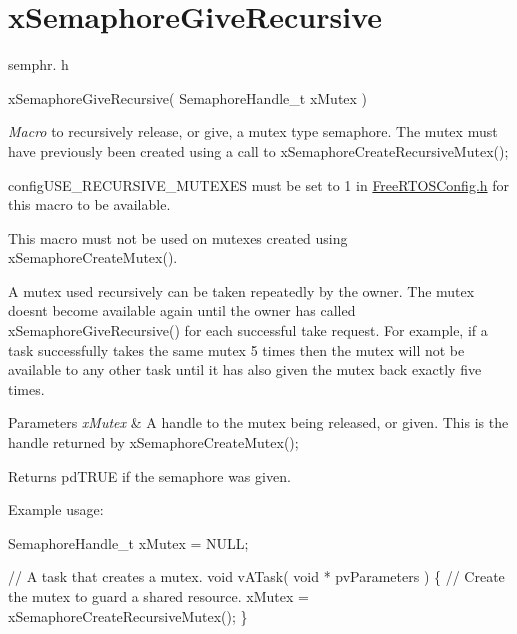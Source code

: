 \hypertarget{group__x_semaphore_give_recursive}{}\section{x\+Semaphore\+Give\+Recursive}
\label{group__x_semaphore_give_recursive}
semphr. h 
\begin{DoxyPre}xSemaphoreGiveRecursive( SemaphoreHandle\_t xMutex )\end{DoxyPre}


{\itshape Macro} to recursively release, or \textquotesingle{}give\textquotesingle{}, a mutex type semaphore. The mutex must have previously been created using a call to x\+Semaphore\+Create\+Recursive\+Mutex();

config\+U\+S\+E\+\_\+\+R\+E\+C\+U\+R\+S\+I\+V\+E\+\_\+\+M\+U\+T\+E\+X\+ES must be set to 1 in \mbox{\hyperlink{_free_r_t_o_s_config_8h_source}{Free\+R\+T\+O\+S\+Config.\+h}} for this macro to be available.

This macro must not be used on mutexes created using x\+Semaphore\+Create\+Mutex().

A mutex used recursively can be \textquotesingle{}taken\textquotesingle{} repeatedly by the owner. The mutex doesn\textquotesingle{}t become available again until the owner has called x\+Semaphore\+Give\+Recursive() for each successful \textquotesingle{}take\textquotesingle{} request. For example, if a task successfully \textquotesingle{}takes\textquotesingle{} the same mutex 5 times then the mutex will not be available to any other task until it has also \textquotesingle{}given\textquotesingle{} the mutex back exactly five times.


\begin{DoxyParams}{Parameters}
{\em x\+Mutex} & A handle to the mutex being released, or \textquotesingle{}given\textquotesingle{}. This is the handle returned by x\+Semaphore\+Create\+Mutex();\\
\hline
\end{DoxyParams}
\begin{DoxyReturn}{Returns}
pd\+T\+R\+UE if the semaphore was given.
\end{DoxyReturn}
Example usage\+: 
\begin{DoxyPre}
SemaphoreHandle\_t xMutex = NULL;\end{DoxyPre}



\begin{DoxyPre}// A task that creates a mutex.
void vATask( void * pvParameters )
\{
   // Create the mutex to guard a shared resource.
   xMutex = xSemaphoreCreateRecursiveMutex();
\}\end{DoxyPre}



